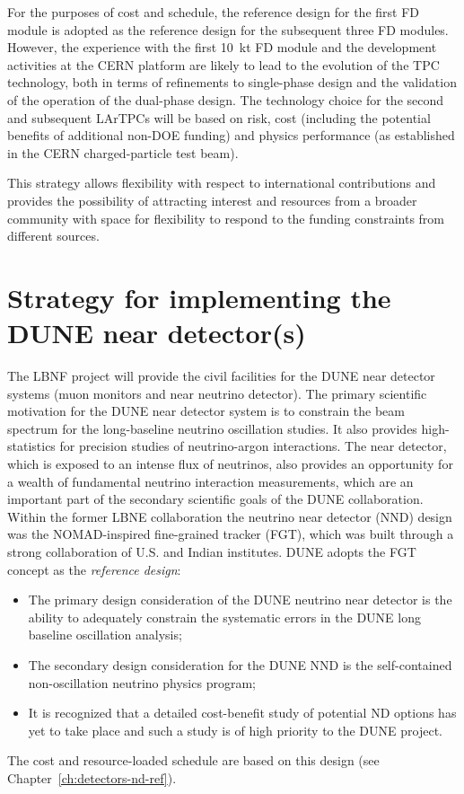 For the purposes of cost and schedule, the reference design for the
first FD module is adopted as the reference design for the subsequent
three FD modules. However, the experience with the first 10~kt FD
module and the development activities at the CERN platform are likely
to lead to the evolution of the TPC technology, both in terms of
refinements to single-phase design and the validation of the operation
of the dual-phase design.  The technology choice for the second and
subsequent LArTPCs will be based on risk, cost (including the
potential benefits of additional non-DOE funding) and physics
performance (as established in the CERN charged-particle test beam).

This strategy allows flexibility with respect to international
contributions and provides the possibility of attracting interest and
resources from a broader community with space for flexibility to
respond to the funding constraints from different sources.

\section{Strategy for implementing the DUNE near detector(s)}

The LBNF project will provide the civil facilities for the DUNE near
detector systems (muon monitors and near neutrino detector). The
primary scientific motivation for the DUNE near detector system is to
constrain the beam spectrum for the long-baseline neutrino oscillation
studies. It also provides high-statistics for precision studies of
neutrino-argon interactions. The near detector, which is exposed to an
intense flux of neutrinos, also provides an opportunity for a wealth
of fundamental neutrino interaction measurements, which are an
important part of the secondary scientific goals of the DUNE
collaboration. Within the former LBNE collaboration the neutrino near
detector (NND) design was the NOMAD-inspired fine-grained tracker
(FGT), which was built through a strong collaboration of U.S. and
Indian institutes. DUNE adopts the FGT concept as the
\textit{reference design}:
\begin{itemize}
\item The primary design consideration of the DUNE neutrino near
  detector is the ability to adequately constrain the systematic
  errors in the DUNE long baseline oscillation analysis;
\item The secondary design consideration for the DUNE NND is the
  self-contained non-oscillation neutrino physics program;
\item It is recognized that a detailed cost-benefit study of potential
  ND options has yet to take place and such a study is of high
  priority to the DUNE project.
\end{itemize}
The cost and resource-loaded schedule are based on this design (see
Chapter~\ref{ch:detectors-nd-ref}).

